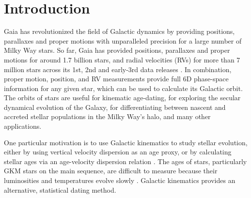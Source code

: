 \section{Introduction}

Gaia has revolutionized the field of Galactic dynamics by providing positions,
parallaxes and proper motions with unparalleled precision for a large number
of Milky Way stars.
So far, Gaia has provided positions, parallaxes and proper motions for around
1.7 billion stars, and radial velocities (RVs) for more than 7 million stars
across its 1st, 2nd and early-3rd data releases \citep{gaia, gaia_dr2,
gaia_edr3}.
In combination, proper motion, position, and RV measurements provide full 6D
phase-space information for any given star, which can be used to calculate its
Galactic orbit.
The orbits of stars are useful for kinematic age-dating, for exploring the
secular dynamical evolution of the Galaxy, for differentiating between nascent
and accreted stellar populations in the Milky Way's halo, and many other
applications.

One particular motivation
is to use Galactic kinematics to study stellar evolution, either by using
vertical velocity dispersion as an age proxy, or by calculating stellar ages
via an age-velocity dispersion relation \citep[\eg][]{angus2020, lu2021}.
The ages of stars, particularly GKM stars on the main sequence, are difficult
to measure because their luminosities and temperatures evolve slowly
\citep[see][for a review of stellar ages]{soderblom2010}.
Galactic kinematics provides an alternative, statistical dating method.


